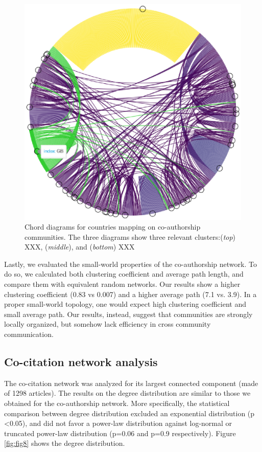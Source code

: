 \documentclass[a4paper, review, endfloat, authoryear]{elsarticle}
\begin{document}
\begin{figure}[htbp]
		\includegraphics[scale=0.8]{pics/coauthorship_country_chord_3.eps}
		\caption{Chord diagrams for countries mapping on co-authorship communities. The three diagrams show three relevant clusters:(\textit{top}) XXX, (\textit{middle}), and (\textit{bottom}) XXX}\label{fig:fig7}
	\end{figure}
	
	Lastly, we evaluated the small-world properties of the co-authorship network. To do so, we calculated both clustering coefficient and average path length, and compare them with equivalent random networks. Our results show a higher clustering coefficient (0.83 vs 0.007) and a higher average path (7.1 vs. 3.9). In a proper small-world topology, one would expect high clustering coefficient and small average path. Our results, instead, suggest that communities are strongly locally organized, but somehow lack efficiency in cross community communication.
	
	\subsection{Co-citation network analysis}
	The co-citation network was analyzed for its largest connected component (made of 1298 articles). The results on the degree distribution are similar to those we obtained for the co-authorship network. More specifically, the statistical comparison between degree distribution excluded an exponential distribution (p \textless 0.05), and did not favor a power-law distribution against log-normal or truncated power-law distribution (p=0.06 and p=0.9 respectively). Figure \ref{fig:fig8} shows the degree distribution.
	
\end{document}
